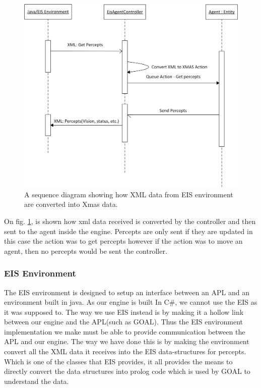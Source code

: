 \begin{figure}
\begin{centering}
\includegraphics[width=1\textwidth]{EisAgentControllerSequenceDiagram}
\par\end{centering}

\caption{A sequence diagram showing how XML data from EIS environment are converted
into Xmas data.\label{fig:EisAgentControllerSequenceDiagram}}


\end{figure}


On fig. \ref{fig:EisAgentControllerSequenceDiagram}, is shown how
xml data received is converted by the controller and then sent to
the agent inside the engine. Percepts are only sent if they are updated
in this case the action was to get percepts however if the action
was to move an agent, then no percepts would be sent the controller.


\subsubsection*{EIS Environment}

The EIS environment is designed to setup an interface between an APL
and an environment built in java. As our engine is built In C\#, we
cannot use the EIS as it was supposed to. The way we use EIS instead
is by making it a hollow link between our engine and the APL(such
as GOAL). Thus the EIS environment implementation we make must be
able to provide communication between the APL and our engine. The
way we have done this is by making the environment convert all the
XML data it receives into the EIS data-structures for percepts. Which
is one of the classes that EIS provides, it all provides the means
to directly convert the data structures into prolog code which is
used by GOAL to understand the data.


